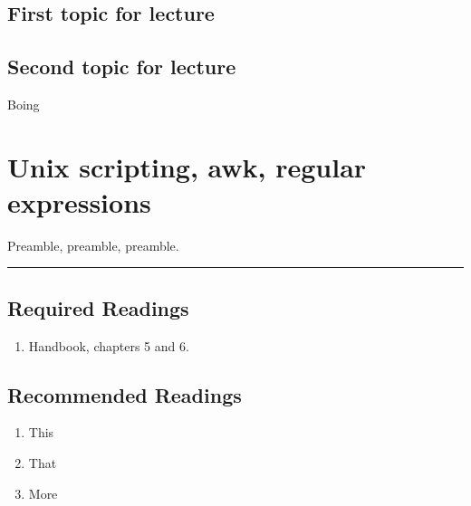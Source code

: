 \documentclass[]{book}
\providecommand{\tightlist}{%
  \setlength{\itemsep}{0pt}\setlength{\parskip}{0pt}}
\begin{document}
\hypertarget{first-topic-for-lecture-1}{%
\section{First topic for lecture}\label{first-topic-for-lecture-1}}

\hypertarget{second-topic-for-lecture-1}{%
\section{Second topic for lecture}\label{second-topic-for-lecture-1}}

Boing

\hypertarget{unix-scripting-awk-regular-expressions}{%
\chapter{Unix scripting, awk, regular expressions}\label{unix-scripting-awk-regular-expressions}}

Preamble, preamble, preamble.

\begin{center}\rule{0.5\linewidth}{\linethickness}\end{center}

\hypertarget{required-readings-3}{%
\section*{Required Readings}\label{required-readings-3}}

\begin{enumerate}
\def\labelenumi{\arabic{enumi}.}
\tightlist
\item
  Handbook, chapters 5 and 6.
\end{enumerate}

\hypertarget{recommended-readings-3}{%
\section*{Recommended Readings}\label{recommended-readings-3}}

\begin{enumerate}
\def\labelenumi{\arabic{enumi}.}
\tightlist
\item
  This
\item
  That
\item
  More
\end{enumerate}
\end{document}
